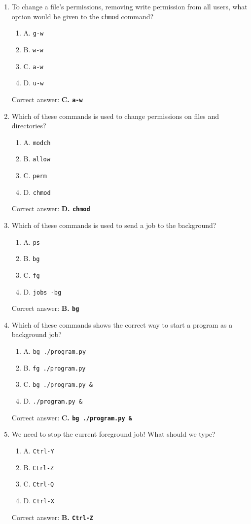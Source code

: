 \documentclass{article}
\begin{document}
\begin{enumerate}
  \item To change a file’s permissions, removing write permission from all users, what option would be given to the \texttt{chmod} command?
  \begin{enumerate}
    \item A. \texttt{g-w}
    \item B. \texttt{w-w}
    \item C. \texttt{a-w}
    \item D. \texttt{u-w}
  \end{enumerate}
  Correct answer: \textbf{C. \texttt{a-w}}
  
  \item Which of these commands is used to change permissions on files and directories?
  \begin{enumerate}
    \item A. \texttt{modch}
    \item B. \texttt{allow}
    \item C. \texttt{perm}
    \item D. \texttt{chmod}
  \end{enumerate}
  Correct answer: \textbf{D. \texttt{chmod}}
  
  \item Which of these commands is used to send a job to the background?
  \begin{enumerate}
    \item A. \texttt{ps}
    \item B. \texttt{bg}
    \item C. \texttt{fg}
    \item D. \texttt{jobs -bg}
  \end{enumerate}
  Correct answer: \textbf{B. \texttt{bg}}
  
  \item Which of these commands shows the correct way to start a program as a background job?
  \begin{enumerate}
    \item A. \texttt{bg ./program.py}
    \item B. \texttt{fg ./program.py}
    \item C. \texttt{bg ./program.py \&}
    \item D. \texttt{./program.py \&}
  \end{enumerate}
  Correct answer: \textbf{C. \texttt{bg ./program.py \&}}
  
  \item We need to stop the current foreground job! What should we type?
  \begin{enumerate}
    \item A. \texttt{Ctrl-Y}
    \item B. \texttt{Ctrl-Z}
    \item C. \texttt{Ctrl-Q}
    \item D. \texttt{Ctrl-X}
  \end{enumerate}
  Correct answer: \textbf{B. \texttt{Ctrl-Z}}
  

\end{enumerate}
\end{document}
